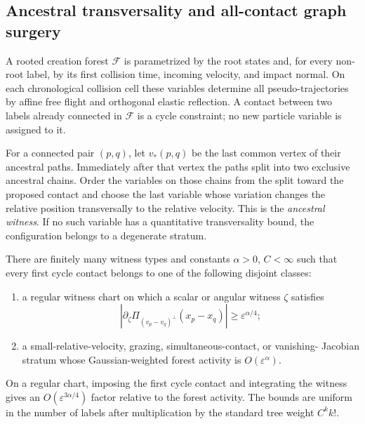 \subsection{Ancestral transversality and all-contact graph surgery}

A rooted creation forest \(\mathcal F\) is parametrized by the root states and,
for every non-root label, by its first collision time, incoming velocity, and
impact normal.  On each chronological collision cell these variables determine
all pseudo-trajectories by affine free flight and orthogonal elastic
reflection.  A contact between two labels already connected in \(\mathcal F\)
is a cycle constraint; no new particle variable is assigned to it.

For a connected pair \((p,q)\), let \(v_*(p,q)\) be the last common vertex of
their ancestral paths.  Immediately after that vertex the paths split into
two exclusive ancestral chains.  Order the variables on those chains from the
split toward the proposed contact and choose the last variable whose variation
changes the relative position transversally to the relative velocity.  This is
the \emph{ancestral witness}.  If no such variable has a quantitative
transversality bound, the configuration belongs to a degenerate stratum.

\begin{lemma}
\label{lem:r3-b2-first-cycle}
There are finitely many witness types and constants \(\alpha>0\), \(C<\infty\)
such that every first cycle contact belongs to one of the following disjoint
classes:
\begin{enumerate}[label=(\roman*)]
\item a regular witness chart on which a scalar or angular witness
      \(\zeta\) satisfies
\[
 \left|\partial_\zeta
 \Pi_{(v_p-v_q)^\perp}(x_p-x_q)\right|
 \ge\varepsilon^{\alpha/4};
\]
\item a small-relative-velocity, grazing, simultaneous-contact, or vanishing-
      Jacobian stratum whose Gaussian-weighted forest activity is
      \(O(\varepsilon^\alpha)\).
\end{enumerate}
On a regular chart, imposing the first cycle contact and integrating the
witness gives an \(O(\varepsilon^{3\alpha/4})\) factor relative to the forest
activity.  The bounds are uniform in the number of labels after multiplication
by the standard tree weight \(C^k k!\).
\end{lemma}

